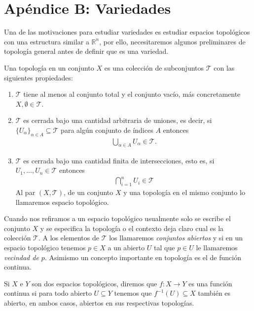 \documentclass[oneside,11pt]{memoir}
\begin{document}
\chapter*{Apéndice B: Variedades}
Una de las motivaciones para estudiar variedades es estudiar espacios topológicos con una estructura similar a $\mathbb{R}^n$, por ello, necesitaremos algunos preliminares de topología general antes de definir que es una variedad.
\begin{definition}
    Una topología en un conjunto $X$ es una colección de subconjuntos $\mathcal{T}$ con las siguientes propiedades:
    \begin{enumerate}
        \item $\mathcal{T}$ tiene al menos al conjunto total y el conjunto vacío, más concretamente $X,\emptyset \in \mathcal{T}$.
        \item $\mathcal{T}$ es cerrada bajo una cantidad arbitraria de uniones, es decir, si $\{U_\alpha\}_{\alpha\in A}\subseteq \mathcal{T}$ para algún conjunto de índices $A$ entonces
        \begin{align*}
            \bigcup_{\alpha\in A}U_\alpha\in \mathcal{T}.
        \end{align*}
        \item $\mathcal{T}$ es cerrada bajo una cantidad finita de intersecciones, esto es, si $U_1,\ldots,U_n\in \mathcal{T}$ entonces
        \begin{align*}
            \bigcap_{i=1}^nU_i\in \mathcal{T}
        \end{align*}
    Al par $(X,\mathcal{T})$, de un conjunto $X$ y una topología en el mismo conjunto lo llamaremos espacio topológico.
    \end{enumerate}
\end{definition}
Cuando nos refiramos a un espacio topológico usualmente solo se escribe el conjunto $X$ y se especifica la topología o el contexto deja claro cual es la colección $\mathcal{T}$. A los elementos de $\mathcal{T}$ los llamaremos \textit{conjuntos abiertos} y si en un espacio topológico tenemos $p\in X$ a un abierto $U$ tal que $p\in U$ le llamaremos \textit{vecindad de $p$}. Asimismo un concepto importante en topología es el de función continua.
\begin{definition}
    Si $X$ e $Y$ son dos espacios topológicos, diremos que $f:X\to Y$ es una función continua si para todo abierto $U\subseteq Y$ tenemos que $f^{-1}(U)\subseteq X$ también es abierto, en ambos casos, abiertos en sus respectivas topologías.
\end{definition}
\end{document}
